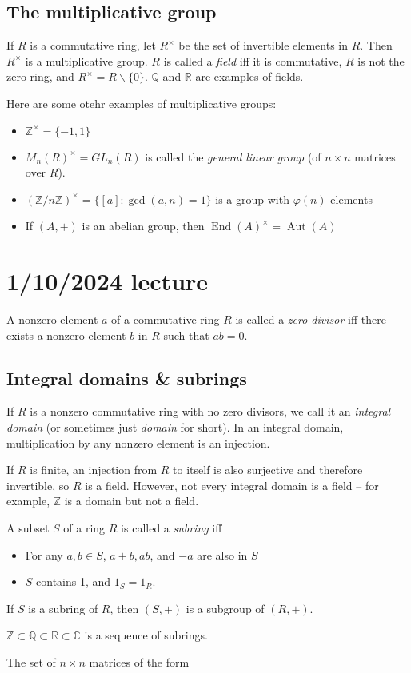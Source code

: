\documentclass[12pt]{article}
\begin{document}
\subsection{The multiplicative group}
If $R$ is a commutative ring, let $R^\times$ be the set of invertible elements in $R$. Then $R^\times$ is a multiplicative group. $R$ is called a \textit{field} iff it is commutative, $R$ is not the zero ring, and $R^\times = R \backslash \{0\}$. $ \mathbb{Q}$ and $ \mathbb{R}$ are examples of fields.
\par
Here are some otehr examples of multiplicative groups:
\begin{itemize}
    \item $ \mathbb{Z}^\times = \{-1, 1\}$
    \item $M_n(R)^\times = GL_n(R)$ is called the \textit{general linear group} (of $n \times n$ matrices over $R$).
    \item $( \mathbb{Z}/n \mathbb{Z})^\times = \{[a]: \operatorname{gcd}(a,n)=1\}$ is a group with $\varphi(n)$ elements
    \item If $(A,+)$ is an abelian group, then $\operatorname{End}(A)^\times = \operatorname{Aut}(A)$
\end{itemize}

\section{1/10/2024 lecture}
A nonzero element $a$ of a commutative ring $R$ is called a \textit{zero divisor} iff there exists a nonzero element $b$ in $R$ such that $ab=0$.
\subsection{Integral domains \& subrings}
If $R$ is a nonzero commutative ring with no zero divisors, we call it an \textit{integral domain} (or sometimes just \textit{domain} for short). In an integral domain, multiplication by any nonzero element is an injection.
\par
If $R$ is finite, an injection from $R$ to itself is also surjective and therefore invertible, so $R$ is a field. However, not every integral domain is a field -- for example, $ \mathbb{Z} $ is a domain but not a field.
\par
A subset $S$ of a ring $R$ is called a \textit{subring} iff
\begin{itemize}
    \item For any $a,b \in S$, $a+b, ab$, and $-a$ are also in $S$
    \item $S$ contains 1, and $1_S=1_R$.
\end{itemize}
If $S$ is a subring of $R$, then $(S,+)$ is a subgroup of $(R,+)$.
\par
$ \mathbb{Z} \subset \mathbb{Q} \subset \mathbb{R} \subset \mathbb{C}$ is a sequence of subrings.
\par
The set of $n \times n$ matrices of the form
\end{document}
